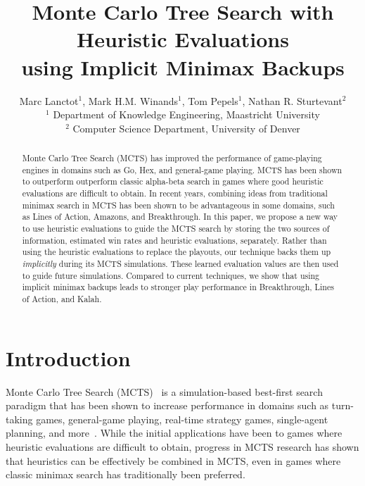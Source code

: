 \documentclass{article}
\title{Monte Carlo Tree Search with Heuristic Evaluations\\using Implicit Minimax Backups}
\author{Marc Lanctot$^1$, Mark H.M. Winands$^1$, Tom Pepels$^1$, Nathan R. Sturtevant$^2$ \\
\hspace{-1cm}$^1$ Department of Knowledge Engineering, Maastricht University\\
\hspace{-1cm}$^2$ Computer Science Department, University of Denver\\}
\date{}
\begin{document}
 


\maketitle
\allowdisplaybreaks

\begin{abstract} 
Monte Carlo Tree Search (MCTS) has improved the performance of game-playing engines in 
domains such as Go, Hex, and general-game playing. MCTS has been shown to outperform
outperform classic alpha-beta search in games where good heuristic evaluations are difficult to obtain. 
In recent years, combining ideas from traditional minimax search in MCTS has been shown to be advantageous in some domains, 
such as Lines of Action, Amazons, and Breakthrough.
In this paper, we propose 
a new way to use heuristic evaluations to guide the MCTS search by storing the two sources of 
information, estimated win rates and heuristic evaluations, separately. 
Rather than using the heuristic evaluations to replace the playouts, 
our technique backs them up {\it implicitly} during its MCTS simulations. 
These learned evaluation values are then used to guide future simulations. 
Compared to current techniques, we show that using implicit minimax backups  
leads to stronger play performance in Breakthrough, Lines of Action, and Kalah. 
\end{abstract} 

%
%

\section{Introduction}

Monte Carlo Tree Search (MCTS)~\cite{Coulom06Efficient,Kocsis06Bandit} is a simulation-based best-first
search paradigm that has been shown to increase performance in domains such as turn-taking games, 
general-game playing, real-time strategy games, single-agent planning, and more~\cite{mctssurvey}. 
While the initial applications have been to games where heuristic evaluations are difficult to obtain, 
progress in MCTS research has shown that heuristics can be effectively be combined in MCTS, even in games 
where classic minimax search has traditionally been preferred. 
\end{document}
